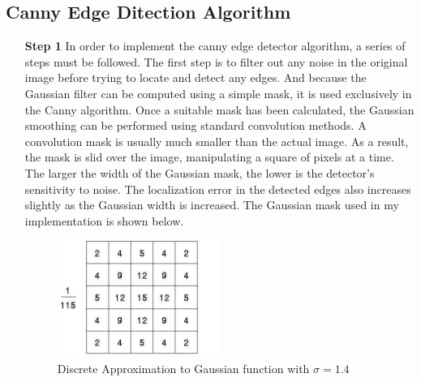 \subsection{Canny Edge Ditection Algorithm}
\begin{enumerate}
\item[\textbf{Step 1}] In order to implement the canny edge detector algorithm, a series of steps must be followed. The first step is to filter out any noise in the original image before trying to locate and detect any edges. And because the Gaussian filter can be computed using a simple mask, it is used exclusively in the Canny algorithm. Once a suitable mask has been calculated, the Gaussian smoothing can be performed using standard convolution methods. A convolution mask is usually much smaller than the actual image. As a result, the mask is slid over the image, manipulating a square of pixels at a time. The larger the width of the Gaussian mask, the lower is the detector's sensitivity to noise. The localization error in the detected edges also increases slightly as the Gaussian width is increased. The Gaussian mask used in my implementation is shown below. 

\begin{figure}[H]
\centering
\label{fig:GaussainMask} 
\includegraphics[width=0.5\textwidth]{GaussMask}
\caption {Discrete Approximation to Gaussian function with $\sigma = 1.4$}
\end{figure}



\end{enumerate}

